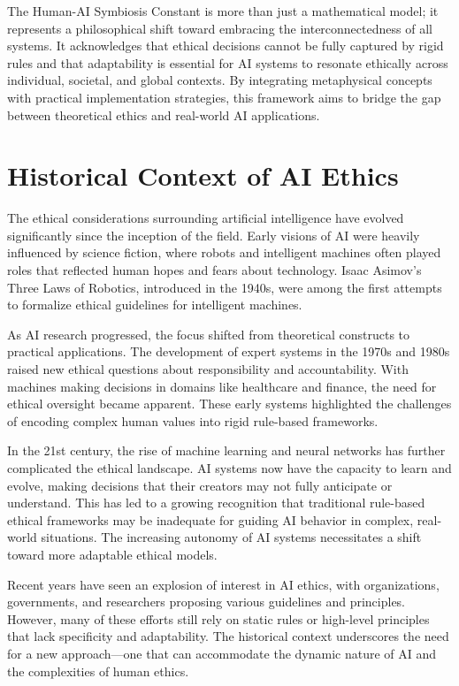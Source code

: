 \documentclass[12pt]{article}
\begin{document}
The Human-AI Symbiosis Constant is more than just a mathematical model; it represents a philosophical shift toward embracing the interconnectedness of all systems. It acknowledges that ethical decisions cannot be fully captured by rigid rules and that adaptability is essential for AI systems to resonate ethically across individual, societal, and global contexts. By integrating metaphysical concepts with practical implementation strategies, this framework aims to bridge the gap between theoretical ethics and real-world AI applications.
\newpage


\section{Historical Context of AI Ethics}

The ethical considerations surrounding artificial intelligence have evolved significantly since the inception of the field. Early visions of AI were heavily influenced by science fiction, where robots and intelligent machines often played roles that reflected human hopes and fears about technology. Isaac Asimov's Three Laws of Robotics, introduced in the 1940s, were among the first attempts to formalize ethical guidelines for intelligent machines.

As AI research progressed, the focus shifted from theoretical constructs to practical applications. The development of expert systems in the 1970s and 1980s raised new ethical questions about responsibility and accountability. With machines making decisions in domains like healthcare and finance, the need for ethical oversight became apparent. These early systems highlighted the challenges of encoding complex human values into rigid rule-based frameworks.

In the 21st century, the rise of machine learning and neural networks has further complicated the ethical landscape. AI systems now have the capacity to learn and evolve, making decisions that their creators may not fully anticipate or understand. This has led to a growing recognition that traditional rule-based ethical frameworks may be inadequate for guiding AI behavior in complex, real-world situations. The increasing autonomy of AI systems necessitates a shift toward more adaptable ethical models.

Recent years have seen an explosion of interest in AI ethics, with organizations, governments, and researchers proposing various guidelines and principles. However, many of these efforts still rely on static rules or high-level principles that lack specificity and adaptability. The historical context underscores the need for a new approach—one that can accommodate the dynamic nature of AI and the complexities of human ethics.
\end{document}
